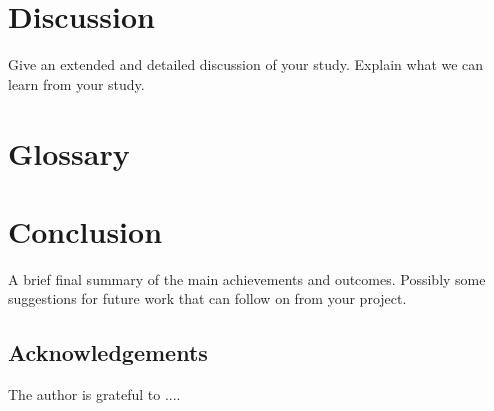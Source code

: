 \documentclass[a4,12pt]{article}
\begin{document}
\section{Discussion}
%
Give an extended and detailed discussion of your study. Explain what we can learn from your study.
%
\section{Glossary}

\section{Conclusion}
%
A brief final summary of the main achievements and outcomes. Possibly some suggestions for future work that can follow on from your project.%
%
\subsection*{Acknowledgements}
The author is grateful to ....
%
\vskip 0.2in


\end{document}
